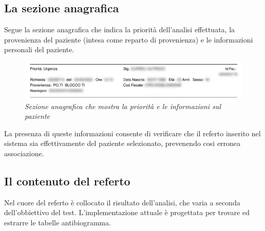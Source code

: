 \subsection{La sezione anagrafica}
Segue la sezione anagrafica che indica la priorità dell'analisi effettuata, la provenienza del paziente (intesa come reparto di provenienza) e le informazioni personali del paziente.
\begin{figure}[h!]
	\centering
	\includegraphics[width=.99\columnwidth]{images/sezione_anagrafica.png}
	\caption{\textit{Sezione anagrafica che mostra la priorità e le informazioni sul paziente}}
	\label{fig:header}
\end{figure}
\bigskip
\newline
La presenza di queste informazioni consente di verificare che il referto inserito nel sistema sia effettivamente del paziente selezionato, prevenendo cosi erronea associazione.

\newpage
\subsection{Il contenuto del referto}
Nel cuore del referto è collocato il risultato dell'analisi, che varia a seconda dell'obbiettivo del test. L'implementazione attuale è progettata per trovare ed estrarre le tabelle antibiogramma. 

